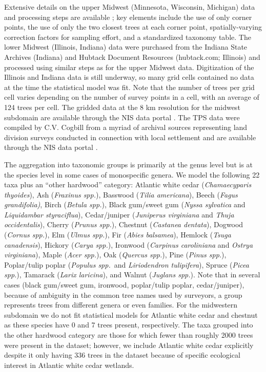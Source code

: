 \documentclass[10pt,letterpaper]{article}
\begin{document}
Extensive details on the upper Midwest (Minnesota, Wisconsin, Michigan)
data and processing steps are available \cite{goring2015composition};
key elements include the use of only corner points, the use of only
the two closest trees at each corner point, spatially-varying correction
factors for sampling effort, and a standardized taxonomy table. The
lower Midwest (Illinois, Indiana) data were purchased from the Indiana
State Archives (Indiana) and Hubtack Document Resources (hubtack.com;
Illinois) and processed using similar steps as for the upper Midwest
data. Digitization of the Illinois and Indiana data is still underway,
so many grid cells contained no data at the time the statistical model
was fit. Note that the number of trees per grid cell varies depending
on the number of survey points in a cell, with an average of 124 trees
per cell. The gridded data at the 8 km resolution for the midwest
subdomain are available through the NIS data portal \cite{Gori:etal:data:2016}.
The TPS data were compiled by C.V. Cogbill from a myriad of archival
sources representing land division surveys conducted in connection
with local settlement and are available through the
NIS data portal \cite{Cogb:dataNE:2016,Cogb:dataOH:2016}. 

The aggregation into taxonomic groups is primarily at the genus level
but is at the species level in some cases of monospecific genera.
We model the following 22 taxa plus an ``other hardwood'' category:
Atlantic white cedar (\emph{Chamaecyparis thyoides}), Ash (\emph{Fraxinus
spp.}), Basswood (\emph{Tilia americana}), Beech (\emph{Fagus grandifolia)},
Birch (\emph{Betula spp.}), Black gum/sweet gum (\emph{Nyssa sylvatica}
and \emph{Liquidambar styraciflua}), Cedar/juniper (\emph{Juniperus
virginiana} and \emph{Thuja occidentalis}), Cherry (\emph{Prunus spp.}),
Chestnut (\emph{Castanea dentata}), Dogwood (\emph{Cornus spp.}),
Elm (\emph{Ulmus spp.}), Fir (\emph{Abies balsamea}), Hemlock (\emph{Tsuga
canadensis}), Hickory (\emph{Carya spp.}), Ironwood (\emph{Carpinus
caroliniana} and \emph{Ostrya virginiana}), Maple (\emph{Acer spp.}),
Oak (\emph{Quercus spp.}), Pine (\emph{Pinus spp.}), Poplar/tulip
poplar (\emph{Populus spp.}~and \emph{Liriodendron tulipifera}),
Spruce (\emph{Picea spp.}), Tamarack (\emph{Larix laricina}), and
Walnut (\emph{Juglans spp.}). Note that in several cases (black gum/sweet
gum, ironwood, poplar/tulip poplar, cedar/juniper), because of ambiguity
in the common tree names used by surveyors, a group represents trees
from different genera or even families. For the midwestern subdomain
we do not fit statistical models for Atlantic white cedar and chestnut
as these species have 0 and 7 trees present, respectively. The taxa
grouped into the other hardwood category are those for which fewer
than roughly 2000 trees were present in the dataset; however, we include
Atlantic white cedar explicitly despite it only having 336 trees in
the dataset because of specific ecological interest in Atlantic white
cedar wetlands. 
\end{document}
